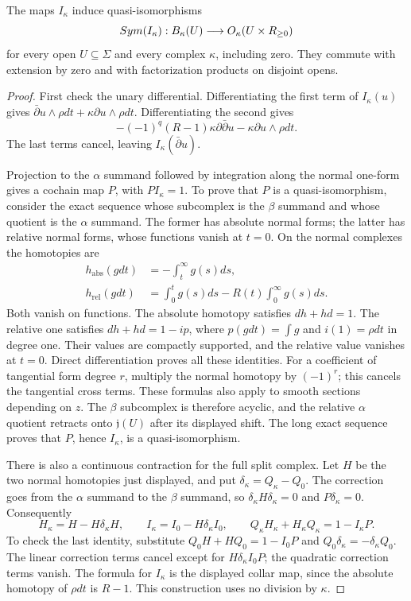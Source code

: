 \begin{theorem}
\label{thm:bf-quantum-boundary}
The maps $I_\kappa$ induce quasi-isomorphisms
\[
 Sym(I_\kappa):B_\kappa(U)
       \longrightarrow O_\kappa(U\times R_{\ge0})
\]
for every open $U\subseteq\Sigma$ and every complex $\kappa$,
including zero.  They commute with extension by zero and with
factorization products on disjoint opens.
\end{theorem}
\begin{proof}
First check the unary differential.  Differentiating the first term
of $I_\kappa(u)$ gives
$\bar\partial u\wedge\rho dt+\kappa\partial u\wedge\rho dt$.
Differentiating the second gives
\[
 -(-1)^q(R-1)\kappa\partial\bar\partial u
                          -\kappa\partial u\wedge\rho dt.
\]
The last terms cancel, leaving $I_\kappa(\bar\partial u)$.

Projection to the $\alpha$ summand followed by integration along the
normal one-form gives a cochain map $P$, with $PI_\kappa=1$.
To prove that $P$ is a quasi-isomorphism, consider the exact sequence
whose subcomplex is the $\beta$ summand and whose quotient is the
$\alpha$ summand.  The former has absolute normal forms; the latter
has relative normal forms, whose functions vanish at $t=0$.
On the normal complexes the homotopies are
\[
 \begin{split}
 h_{\mathrm{abs}}(gdt)&=-\int_t^\infty g(s)ds,\\
 h_{\mathrm{rel}}(gdt)&=\int_0^t g(s)ds-R(t)\int_0^\infty g(s)ds.
 \end{split}
\]
Both vanish on functions.  The absolute homotopy satisfies $dh+hd=1$.
The relative one satisfies $dh+hd=1-ip$, where
$p(gdt)=\int g$ and $i(1)=\rho dt$ in degree one.
Their values are compactly supported, and the relative value vanishes
at $t=0$.  Direct differentiation proves all these identities.
For a coefficient of tangential form degree $r$, multiply the
normal homotopy by $(-1)^r$; this cancels the tangential cross terms.
These formulas also apply to smooth sections depending on $z$.
The $\beta$ subcomplex is therefore acyclic, and the relative
$\alpha$ quotient retracts onto $\mathfrak j(U)$ after its displayed
shift.  The long exact sequence proves that $P$, hence $I_\kappa$,
is a quasi-isomorphism.

There is also a continuous contraction for the full split complex.
Let $H$ be the two normal homotopies just displayed, and put
$\delta_\kappa=Q_\kappa-Q_0$.  The correction goes from the
$\alpha$ summand to the $\beta$ summand, so
$\delta_\kappa H\delta_\kappa=0$ and $P\delta_\kappa=0$.
Consequently
\[
 H_\kappa=H-H\delta_\kappa H,\qquad
 I_\kappa=I_0-H\delta_\kappa I_0,\qquad
 Q_\kappa H_\kappa+H_\kappa Q_\kappa=1-I_\kappa P.
\]
To check the last identity, substitute
$Q_0H+HQ_0=1-I_0P$ and
$Q_0\delta_\kappa=-\delta_\kappa Q_0$.
The linear correction terms cancel except for
$H\delta_\kappa I_0P$; the quadratic correction terms vanish.
The formula for $I_\kappa$ is the displayed collar map, since the
absolute homotopy of $\rho dt$ is $R-1$.
This construction uses no division by $\kappa$.


\end{proof}
